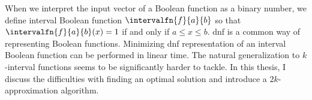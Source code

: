 

When we interpret the input vector of a Boolean function as a binary number,
we define interval Boolean function $\intervalfn{f}{a}{b}$
so that $\intervalfn{f}{a}{b}(x) = 1$ if and only if $a \leq x \leq b$.
\Acrlong{dnf} is a common way of representing Boolean functions.
Minimizing \acrshort{dnf} representation of an interval Boolean function
can be performed in linear time.\cite{Schieber2005154}
The natural generalization to $k$-interval functions
seems to be significantly harder to tackle.
In this thesis,
I discuss the difficulties with finding an optimal solution
and introduce a $2k$-approximation algorithm.
